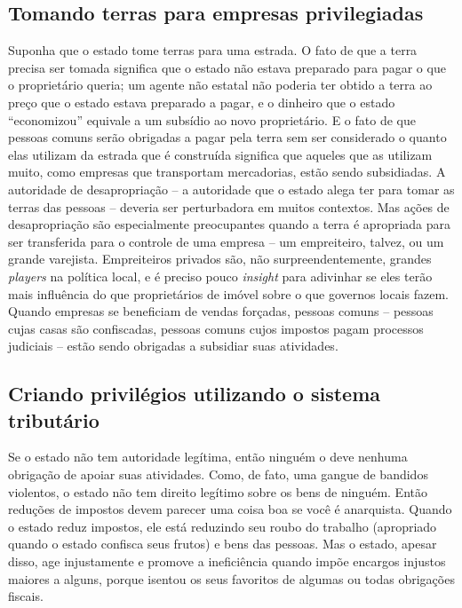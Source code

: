 \subsection*{Tomando terras para empresas privilegiadas}

Suponha que o estado tome terras para uma estrada. O fato de que a terra precisa ser tomada significa que o estado não estava preparado para pagar o que o proprietário queria; um agente não estatal não poderia ter obtido a terra ao preço que o estado estava preparado a pagar, e o dinheiro que o estado ``economizou'' equivale a um subsídio ao novo proprietário. E o fato de que pessoas comuns serão obrigadas a pagar pela terra sem ser considerado o quanto elas utilizam da estrada que é construída significa que aqueles que as utilizam muito, como empresas que transportam mercadorias, estão sendo subsidiadas. A autoridade de desapropriação -- a autoridade que o estado alega ter para tomar as terras das pessoas -- deveria ser perturbadora em muitos contextos. Mas ações de desapropriação são especialmente preocupantes quando a terra é apropriada para ser transferida para o controle de uma empresa -- um empreiteiro, talvez, ou um grande varejista. Empreiteiros privados são, não surpreendentemente, grandes \emph{players} na política local, e é preciso pouco \emph{insight} para adivinhar se eles terão mais influência do que proprietários de imóvel sobre o que governos locais fazem. Quando empresas se beneficiam de vendas forçadas, pessoas comuns -- pessoas cujas casas são confiscadas, pessoas comuns cujos impostos pagam processos judiciais -- estão sendo obrigadas a subsidiar suas atividades.

\subsection*{Criando privilégios utilizando o sistema tributário}

Se o estado não tem autoridade legítima, então ninguém o deve nenhuma obrigação de apoiar suas atividades. Como, de fato, uma gangue de bandidos violentos, o estado não tem direito legítimo sobre os bens de ninguém. Então reduções de impostos devem parecer uma coisa boa se você é anarquista. Quando o estado reduz impostos, ele está reduzindo seu roubo do trabalho (apropriado quando o estado confisca seus frutos) e bens das pessoas. Mas o estado, apesar disso, age injustamente e promove a ineficiência quando impõe encargos injustos maiores a alguns, porque isentou os seus favoritos de algumas ou todas obrigações fiscais.

